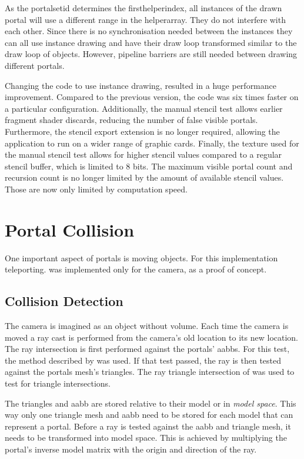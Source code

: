 As the \gls{portalsetid} determines the \gls{firsthelperindex}, all instances of the drawn portal will use a different range in the \gls{helperarray}. They do not interfere with each other. Since there is no synchronisation needed between the instances they can all use instance drawing and have their draw loop transformed similar to the draw loop of objects. However, pipeline barriers are still needed between drawing different portals.

Changing the code to use instance drawing, resulted in a huge performance improvement. Compared to the previous version, the code was six times faster on a particular configuration. Additionally, the manual stencil test allows earlier fragment shader discards, reducing the number of false visible portals. Furthermore, the stencil export extension is no longer required, allowing the application to run on a wider range of graphic cards. Finally, the texture used for the manual stencil test allows for higher stencil values compared to a regular stencil buffer, which is limited to 8 bits. The maximum visible portal count and recursion count is no longer limited by the amount of available stencil values. Those are now only limited by computation speed.


\section{Portal Collision}
One important aspect of portals is moving objects. For this implementation teleporting. was implemented only for the camera, as a proof of concept.

\subsection{Collision Detection}
The camera is imagined as an object without volume. Each time the camera is moved a ray cast is performed from the camera's old location to its new location. The ray intersection is first performed against the portals' \glspl{aabb}. For this test, the method described by \textcite{williams:2005:efficient} was used. If that test passed, the ray is then tested against the portals mesh's triangles. The ray triangle intersection of \textcite{moller:2005:fast} was used to test for triangle intersections.


The triangles and \gls{aabb} are stored relative to their model or in \textit{model space}. This way only one triangle mesh and \gls{aabb} need to be stored for each model that can represent a portal. Before a ray is tested against the \gls{aabb} and triangle mesh, it needs to be transformed into model space. This is achieved by multiplying the portal's inverse model matrix with the origin and direction of the ray.

